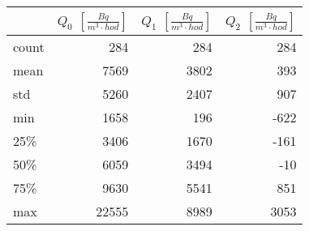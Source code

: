 \begin{tabular}{lrrr}
\toprule
{} &  $Q_0$ $\left[\si{\frac{Bq}{m^3\cdot hod}}\right]$ &  $Q_1$ $\left[\si{\frac{Bq}{m^3\cdot hod}}\right]$ &  $Q_2$ $\left[\si{\frac{Bq}{m^3\cdot hod}}\right]$ \\
\midrule
count &                                                284 &                                                284 &                                                284 \\
mean  &                                               7569 &                                               3802 &                                                393 \\
std   &                                               5260 &                                               2407 &                                                907 \\
min   &                                               1658 &                                                196 &                                               -622 \\
25\%   &                                               3406 &                                               1670 &                                               -161 \\
50\%   &                                               6059 &                                               3494 &                                                -10 \\
75\%   &                                               9630 &                                               5541 &                                                851 \\
max   &                                              22555 &                                               8989 &                                               3053 \\
\bottomrule
\end{tabular}
